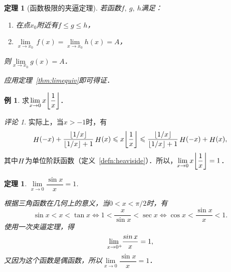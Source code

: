 \documentclass[a4paper,punct=CCT]{ctexbook}
\makeatletter
\renewcommand*{\enumparen}[1]{（\makebox[0.6em][c]{\normalfont#1}）}
\newtheorem{theorem}{定理}
\newtheorem*{theorem*}{定理}
\theoremstyle{definition}
\newtheorem*{example*}{例}
\theoremstyle{remark}
\newtheorem*{remark}{评论}
\renewenvironment{proof}[1][\proofname]{\par
  \pushQED{\qed}%
  \normalfont \topsep6\p@\@plus6\p@\relax
  \trivlist
  \item[]\ignorespaces
}{%
  \popQED\endtrivlist\@endpefalse
}
\let\leq\leqslant
\let\le\leq
\makeatother
\begin{document}
\begin{theorem}[函数极限的夹逼定理]
  \label{thm:funcsqueeze}
  若函数\(f,\ g,\ h\)满足：
  \begin{enumerate}[topsep=0ex,itemsep=0ex]
    \renewcommand{\labelenumi}{\enumparen{\arabic{enumi}}}
  \item 在点\(x_0\)附近有\(f \le g \le h\)，
  \item \(\lim\limits_{x \to x_0} \,f(x) = \lim\limits_{x \to x_0} h(x) = A\)，
  \end{enumerate}
  则\(\lim\limits_{x \to x_0} g(x) = A\)．

  \begin{proof}
    应用定理~\ref{thm:limequiv}即可得证．
  \end{proof}
\end{theorem}

\begin{example*}
  求\(\lim\limits_{x\to0} x \floor[\bigg]{\dfrac1x}\)．

  \begin{remark}
    实际上，当\(x > -1\)时，有
    \begin{equation*}
      \Fn H(-x) + \frac{\floor{1/x}}{\floor{1/x}+1} \Fn H(x)
      \le
      x \floor[\bigg]{\dfrac1x}
      \le
      \frac{\floor{1/x}}{\floor{1/x}+1} \Fn H(-x) + \Fn H(x),
    \end{equation*}
    其中\(\Fn H\)为单位阶跃函数（定义~\ref{defn:heaviside}）．所以，\(\lim\limits_{x\to0} x \floor[\bigg]{\dfrac1x} = 1\)．
  \end{remark}
\end{example*}

\begin{theorem*}
  \(\lim\limits_{x\to0} \dfrac{\sin x}{x} = 1\).

  \begin{proof}
    根据三角函数在几何上的意义，当\(0 < x < \pi/2\)时，有
    \begin{equation*}
      \sin x < x < \tan x
      \iff
      1 < \frac{x}{\sin x} < \sec x
      \iff
      \cos x < \frac{\sin x}{x} < 1.
    \end{equation*}
    使用一次夹逼定理，得
    \begin{equation*}
      \lim_{x\to0^+\negthickspace} \frac{\sin x}{x} = 1,
    \end{equation*}
    又因为这个函数是偶函数，所以\(\lim\limits_{x\to0} \dfrac{\sin x}{x} = 1\)．
  \end{proof}
\end{theorem*}
\end{document}
